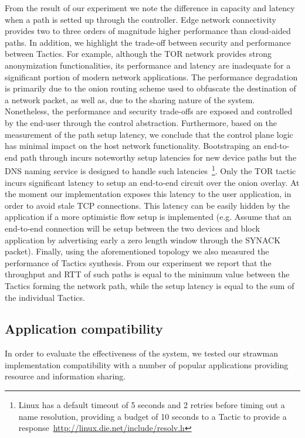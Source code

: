 From the result of our experiment we note the difference in capacity and latency
when a path is setted up through the \signpost controller. Edge network
connectivity provides two to three orders of magnitude higher performance than
cloud-aided paths. In addition, we highlight the trade-off between security and
performance between Tactics. For example, although the TOR network provides
strong anonymization functionalities, its performance and latency are inadequate
for a significant portion of modern network applications. The performance
degradation is primarily due to the onion routing scheme used to obfuscate the
destination of a network packet, as well as, due to the sharing nature of the
system.  Nonetheless, the performance and security trade-offs are exposed and
controlled by the end-user through the \signpost control abstraction.
Furthermore, based on the measurement of the path setup latency, we conclude
that the \signpost control plane logic has minimal impact on the host network
functionality. Bootstraping an end-to-end path through \signpost incurs
noteworthy setup latencies for new device paths but the DNS naming service is
designed to handle such latencies~\footnote{Linux has a default timeout of 5
  seconds and 2 retries before timing out a name resolution, providing a budget
  of 10 seconds to a \signpost Tactic to provide a
  response~\url{http://linux.die.net/include/resolv.h}}. Only the TOR tactic
incurs significant latency to setup an end-to-end circuit over the onion
overlay. At the moment our implementation exposes this latency to the user
application, in order to avoid stale TCP connections. This latency can be easily
hidden by the application if a more optimistic flow setup is implemented (e.g.
Assume that an end-to-end connection will be setup between the two devices and
block application by advertising early a zero length window through the SYNACK
packet).  Finally, using the aforementioned topology we also measured the
performance of Tactics synthesis.  From our experiment we report that the
throughput and RTT of such paths is equal to the minimum value between the Tactics
forming the network path, while the setup latency is equal to the sum of
the individual Tactics. 

\subsection{Application compatibility}

In order to evaluate the effectiveness of the \signpost system, we tested our
strawman implementation compatibility with a number of popular applications
providing resource and information sharing.

